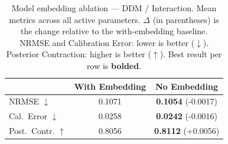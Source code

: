 \begin{table}[t]
\centering
\caption{Model embedding ablation — DDM / Interaction. Mean metrics across
all active parameters. $\Delta$ (in parentheses) is the change relative to the
with-embedding baseline. NRMSE and Calibration Error: lower is better ($\downarrow$).
Posterior Contraction: higher is better ($\uparrow$). Best result per row is
\textbf{bolded}.}
\label{tab:embed_ablation_ddm_interaction}
\begin{tabular}{lcc}
\toprule
 & With Embedding & No Embedding \\
\midrule
NRMSE $\downarrow$ & 0.1071 & \textbf{0.1054} \small{(-0.0017)} \\
Cal.\ Error $\downarrow$ & 0.0258 & \textbf{0.0242} \small{(-0.0016)} \\
Post.\ Contr. $\uparrow$ & 0.8056 & \textbf{0.8112} \small{(+0.0056)} \\
\bottomrule
\end{tabular}
\end{table}